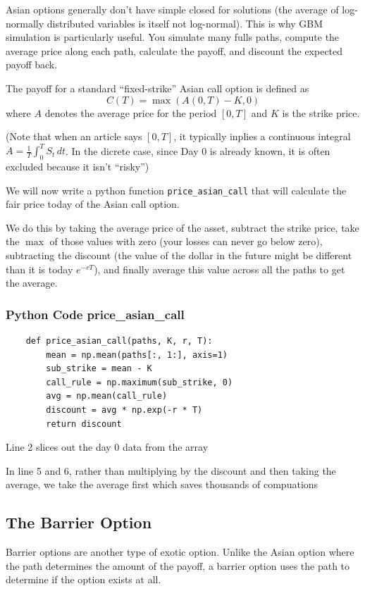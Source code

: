 \documentclass{article}
\begin{document}
Asian options generally don't have simple closed for solutions
(the average of log-normally distributed variables is itself not log-normal).
This is why GBM simulation is particularly useful.
You simulate many fulls paths, compute the average price along each path, calculate the payoff, and discount the expected payoff back.

The payoff for a standard ``fixed-strike'' Asian call option is defined as \[C(T)=\max(A(0,T)-K,0)\] where \(A\) denotes the average price for the period \([0,T]\) and \(K\) is the strike price.

(Note that when an article says \([0,T]\), it typically inplies a continuous integral \(A=\frac{1}{T}\int_{0}^{T}S_t\,dt\).
In the dicrete case, since Day 0 is already known, it is often excluded because it isn't ``risky'')

We will now write a python function \texttt{price\_asian\_call} that will calculate the fair price today of the Asian call option.

We do this by taking the average price of the asset,
subtract the strike price,
take the \(\max\) of those values with zero (your losses can never go below zero),
subtracting the discount (the value of the dollar in the future might be different than it is today \(e^{-rT}\)),
and finally average this value across all the paths to get the average.

\subsubsection*{Python Code price\_asian\_call}
\begin{lstlisting}
    def price_asian_call(paths, K, r, T):
        mean = np.mean(paths[:, 1:], axis=1)
        sub_strike = mean - K
        call_rule = np.maximum(sub_strike, 0)
        avg = np.mean(call_rule)
        discount = avg * np.exp(-r * T)
        return discount
\end{lstlisting}

Line 2 slices out the day 0 data from the array

In line 5 and 6, rather than multiplying by the discount and then taking the average, we take the average first which saves thousands of compuations

\subsection*{The Barrier Option}
Barrier options are another type of exotic option.
Unlike the Asian option where the path determines the amount of the payoff,
a barrier option uses the path to determine if the option exists at all.
\end{document}
